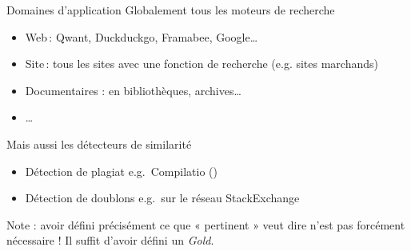 \documentclass[hyperref={unicode}, xcolor={svgnames}, french]{beamer}
\begin{document}
\begin{frame}{Domaines d'application}
    Globalement tous les moteurs de recherche
    \begin{itemize}
        \item Web : Qwant, Duckduckgo, Framabee, Google…
        \item Site : tous les sites avec une fonction de recherche (e.g. sites marchands)
        \item Documentaires : en bibliothèques, archives…
        \item …
    \end{itemize}
    Mais aussi les détecteurs de similarité
    \begin{itemize}
        \item Détection de plagiat e.g.\ Compilatio ()
        \item Détection de doublons e.g.\ sur le réseau StackExchange
    \end{itemize}
    Note : avoir défini précisément ce que « pertinent » veut dire n'est pas forcément nécessaire ! Il suffit d'avoir défini un \textit{Gold}.
\end{frame}
\end{document}
